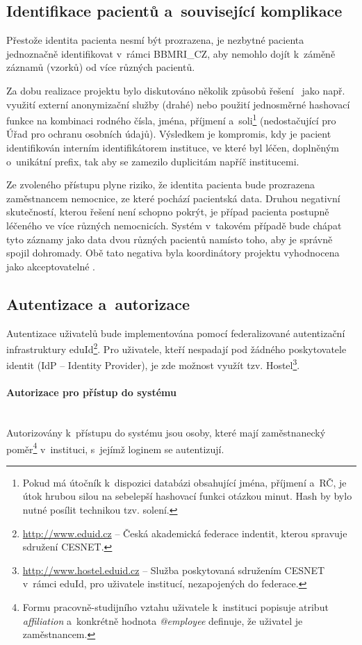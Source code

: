 \documentclass[11pt, draft, oneside]{fithesis2}
\newcommand{\paragraphNewLine}[1]{\paragraph*{#1}\mbox{}\\}
\newcommand{\ProjectName}{\mbox{BBMRI\_CZ}\xspace}
\begin{document}
\subsection{Identifikace pacientů a~související komplikace}
Přestože identita pacienta nesmí být prozrazena, je nezbytné pacienta jednoznačně identifikovat v~rámci \ProjectName, aby nemohlo dojít k~záměně záznamů (vzorků) od více různých pacientů. 

Za dobu realizace projektu bylo diskutováno několik způsobů řešení~\cite{ARCH_2014_1_25} jako např. využití externí anonymizační služby (drahé) nebo použití jednosměrné hashovací funkce na kombinaci rodného čísla, jména, příjmení a~soli\footnote{Pokud má útočník k~dispozici databázi obsahující jména, příjmení a~RČ, je útok hrubou silou na sebelepší hashovací funkci otázkou minut. Hash by bylo nutné posílit technikou tzv. solení.} (nedostačující pro Úřad pro ochranu osobních údajů). 
Výsledkem je kompromis, kdy je pacient identifikován interním identifikátorem instituce, ve které byl léčen, doplněným o~unikátní prefix, tak aby se zamezilo duplicitám napříč institucemi.

Ze zvoleného přístupu plyne riziko, že identita pacienta bude prozrazena zaměstnancem nemocnice, ze které pochází pacientská data. Druhou negativní skutečností, kterou řešení není schopno pokrýt, je případ pacienta postupně léčeného ve více různých nemocnicích. Systém v~takovém případě bude chápat tyto záznamy jako data dvou různých pacientů namísto toho, aby je správně spojil dohromady. Obě tato negativa byla koordinátory projektu vyhodnocena jako akceptovatelné .

\subsection{Autentizace a~autorizace}\label{chapter:analysis:subsection:authorization}
Autentizace uživatelů bude implementována pomocí federalizované autentizační infrastruktury eduId\footnote{\url{http://www.eduid.cz} -- Česká akademická federace indentit, kterou spravuje sdružení CESNET.}. Pro uživatele, kteří nespadají pod žádného poskytovatele identit (IdP -- Identity Provider), je zde možnost využít tzv. Hostel\footnote{\url{http://www.hostel.eduid.cz} -- Služba poskytovaná sdružením CESNET v~rámci eduId, pro uživatele institucí, nezapojených do federace.}. 

\paragraphNewLine{Autorizace pro přístup do systému}
Autorizovány k~přístupu do systému jsou osoby, které mají zaměstnanecký poměr\footnote{Formu pracovně-studijního vztahu uživatele k~instituci popisuje atribut \textit{affiliation} a~konkrétně hodnota \textit{@employee} definuje, že uživatel je zaměstnancem.} v~instituci, s~jejímž loginem se autentizují.
\end{document}
